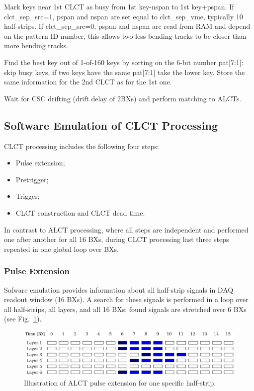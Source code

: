 Mark keys near 1st CLCT as busy from 1st key-nspan to 1st key+pspan.
If clct\_sep\_src=1, pspan and nspan are set equal to clct\_sep\_vme, typically 10 half-strips.
If clct\_sep\_src=0, pspan and nspan are read from RAM and depend on the pattern ID number, this allows two less bending tracks to be closer than more bending tracks.

Find the best key out of 1-of-160 keys by sorting on the 6-bit number pat[7:1]: skip busy keys, if two keys have the same pat[7:1] take the lower key.
Store the same information for the 2nd CLCT as for the 1st one.

Wait for CSC drifting (drift delay of 2BXs) and perform matching to ALCTs.

\newpage
\subsection{Software Emulation of CLCT Processing}

CLCT processing includes the following four steps:

\begin{itemize}
    \item Pulse extension;
    \item Pretrigger;
    \item Trigger;
    \item CLCT construction and CLCT dead time.
\end{itemize}

In contrast to ALCT processing, where all steps are independent and performed one after another for all 16 BXs, during CLCT processing last three steps repeated in one global loop over BXs.

\subsubsection{Pulse Extension}

Sofware emulation provides information about all half-strip signals in DAQ readout window (16 BXs). A search for these signals is performed in a loop over all half-strips, all layers, and all 16 BXs; found signals are stretched over 6 BXs (see Fig.~\ref{fig:clct_pulse_extension}).

\begin{figure}[tbh]
        \begin{center}
                \includegraphics[width=0.9\linewidth]{figures/stretched_hits_clct.pdf}
                \caption{Illustration of ALCT pulse extension for one specific half-strip.}
                \label{fig:clct_pulse_extension}
        \end{center}
\end{figure}

